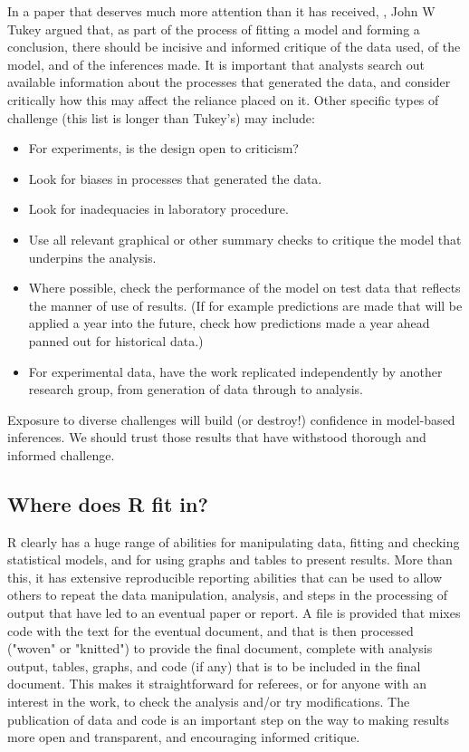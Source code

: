 In a paper that deserves much more attention than it has received,
\citep{tukey_1997}, John W Tukey
argued that, as part of the process of fitting a model and forming a
conclusion, there should be  incisive and informed critique of the data
used, of the model, and of the inferences made. It is important that
analysts search out available information about the processes that
generated the data, and consider critically how this may affect the
reliance placed on it. Other specific types of challenge (this list is
longer than Tukey's) may include:
\begin{itemize}
\tightlist
\item For experiments, is the design open to criticism?
\item Look for biases in processes that generated the data.
\item Look for inadequacies in laboratory procedure.
\item Use all relevant graphical or other summary checks to
critique the model that underpins the analysis.
\item Where possible, check the performance of the model on
test data that reflects the manner of use of results.
(If for example predictions are made that will be applied a
year into the future, check how predictions made a year
ahead panned out for historical data.)
\item For experimental data, have the work replicated
independently by another research group, from generation of
data through to analysis.
\end{itemize}
Exposure to diverse challenges will build (or destroy!) confidence
in model-based inferences. We should trust those results that have
withstood thorough and informed challenge. 

\subsection*{Where does R fit in?}

R clearly has a huge range of abilities for manipulating data, fitting
and checking statistical models, and for using graphs and tables to
present results.  More than this, it has extensive reproducible
reporting abilities that can be used to allow others to repeat the
data manipulation, analysis, and steps in the processing of output
that have led to an eventual paper or report.  A file is provided
that mixes code with the text for the eventual document, and that
is then processed ("woven" or "knitted") to provide the final
document, complete with analysis output, tables, graphs, and code
(if any) that is to be included in the final document.  This makes
it straightforward for referees, or for anyone with an interest in 
the work, to check the analysis and/or try modifications.
The publication of data and code is an important step on the way
to making results more open and transparent, and encouraging 
informed critique.


